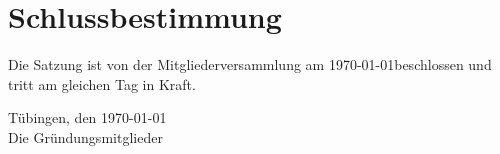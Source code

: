\section{Schlussbestimmung}
	Die Satzung ist von der Mitgliederversammlung am \today \space beschlossen und tritt am gleichen Tag in Kraft.

\vfill
{Tübingen, den \today\\
Die Gründungsmitglieder}